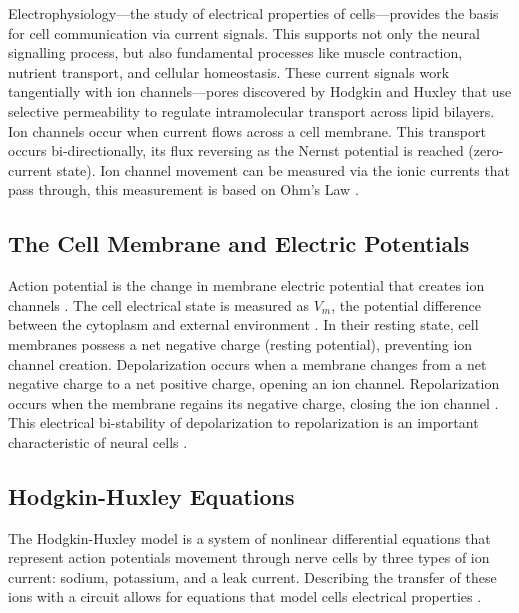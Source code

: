\documentclass{article} %
\begin{document}
\begin{multicols}{2}
Electrophysiology—the study of electrical properties of cells—provides the basis for cell communication via current signals. 
This supports not only the neural signalling process, but also fundamental processes like muscle contraction, nutrient transport, and cellular homeostasis. 
These current signals work tangentially with ion channels—pores discovered by Hodgkin and Huxley that use selective permeability to regulate intramolecular transport across lipid bilayers. 
Ion channels occur when current flows across a cell membrane. This transport occurs bi-directionally, its flux reversing as the Nernst potential is reached (zero-current state). 
Ion channel movement can be measured via the ionic currents that pass through, this measurement is based on Ohm's Law \citep{rubaiy2017electrophysiology}.

\subsection{The Cell Membrane and Electric Potentials}
\label{subsubsec:resting_potential}

Action potential is the change in membrane electric potential that creates ion channels \cite{rubaiy2017electrophysiology}. 
The cell electrical state is measured as $V_{m}$, the potential difference between the cytoplasm and external environment \cite{cervera2016bioelectrical}. 
In their resting state, cell membranes possess a net negative charge (resting potential), preventing ion channel creation. 
Depolarization occurs when a membrane changes from a net negative charge to a net positive charge, opening an ion channel. 
Repolarization occurs when the membrane regains its negative charge, closing the ion channel \cite{rubaiy2017electrophysiology}. 
This electrical bi-stability of depolarization to repolarization is an important characteristic of neural cells \cite{cervera2016bioelectrical}.

\subsection{Hodgkin-Huxley Equations}
\label{subsec:hodgekin_huxley}

The Hodgkin-Huxley model is a system of nonlinear differential equations that represent action potentials movement through nerve cells by three types of ion current: sodium, potassium, and a leak current. 
Describing the transfer of these ions with a circuit allows for equations that model cells electrical properties \cite{Schwiening2012}. 


\end{multicols}
\end{document}
